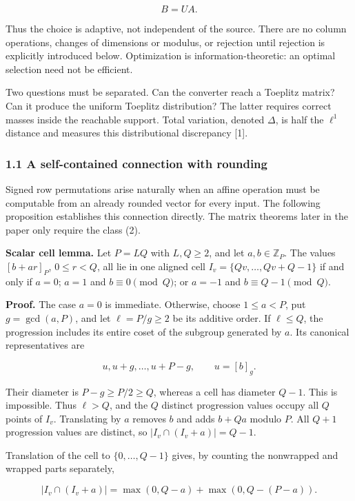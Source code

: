 \documentclass[
]{article}
\begin{document}
\[
B=UA.
\tag{2}
\]

Thus the choice is adaptive, not independent of the source. There are no
column operations, changes of dimensions or modulus, or rejection until
rejection is explicitly introduced below. Optimization is
information-theoretic: an optimal selection need not be efficient.

Two questions must be separated. Can the converter reach a Toeplitz
matrix? Can it produce the uniform Toeplitz distribution? The latter
requires correct masses inside the reachable support. Total variation,
denoted \(\Delta\), is half the \(\ell^1\) distance and measures this
distributional discrepancy {[}1{]}.

\subsubsection{1.1 A self-contained connection with
rounding}\label{a-self-contained-connection-with-rounding}

Signed row permutations arise naturally when an affine operation must be
computable from an already rounded vector for every input. The following
proposition establishes this connection directly. The matrix theorems
later in the paper only require the class (2).

\textbf{Scalar cell lemma.} Let \(P=LQ\) with \(L,Q\ge2\), and let
\(a,b\in\mathbb Z_P\). The values \([b+ar]_P\), \(0\le r<Q\), all lie in
one aligned cell \(I_v=\{Qv,\ldots,Qv+Q-1\}\) if and only if \(a=0\);
\(a=1\) and \(b\equiv0\pmod Q\); or \(a=-1\) and \(b\equiv Q-1\pmod Q\).

\textbf{Proof.} The case \(a=0\) is immediate. Otherwise, choose
\(1\le a<P\), put \(g=\gcd(a,P)\), and let \(\ell=P/g\ge2\) be its
additive order. If \(\ell\le Q\), the progression includes its entire
coset of the subgroup generated by \(a\). Its canonical representatives
are

\[
u,u+g,\ldots,u+P-g,\qquad u=[b]_g.
\]

Their diameter is \(P-g\ge P/2\ge Q\), whereas a cell has diameter
\(Q-1\). This is impossible. Thus \(\ell>Q\), and the \(Q\) distinct
progression values occupy all \(Q\) points of \(I_v\). Translating by
\(a\) removes \(b\) and adds \(b+Qa\) modulo \(P\). All \(Q+1\)
progression values are distinct, so \(|I_v\cap(I_v+a)|=Q-1\).

Translation of the cell to \(\{0,\ldots,Q-1\}\) gives, by counting the
nonwrapped and wrapped parts separately,

\[
|I_v\cap(I_v+a)|=\max(0,Q-a)+\max(0,Q-(P-a)).
\]
\end{document}
